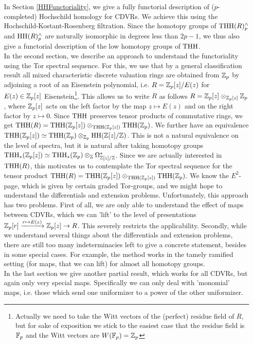 In Section \ref{HHFunctoriality}, we give a fully functorial description of ($p$-completed) Hochschild homology for CDVRs. We achieve this using the Hochschild-Kostant-Rosenberg filtration. Since the homotopy groups of $\operatorname{THH}(R)_p^{\wedge}$ and $\operatorname{HH}(R)_p^{\wedge}$ are naturally isomorphic in degrees less than $2p-1$, we thus also give a functorial description of the low homotopy groups of $\operatorname{THH}$.\\
In the second section, we describe an approach to understand the functoriality using the Tor spectral sequence. 
For this, we use that by a general classification result all mixed characteristic discrete valuation rings are obtained from $\mathbb{Z}_p$ by adjoining a root of an Eisenstein polynomial, i.e. $R=\mathbb{Z}_p[z]/E(z)$ for $E(z)\in \mathbb{Z}_p[z]$ Eisenstein\footnote{Actually we need to take the Witt vectors of the (perfect) residue field of $R$, but for sake of exposition we stick to the easiest case that the residue field is $\mathbb{F}_p$ and the Witt vectors are $W(\mathbb{F}_p)=\mathbb{Z}_p$}. This allows us to write $R$ as follows $R=\mathbb{Z}_p[z]\otimes_{\mathbb{Z}_p[z]}\mathbb{Z}_p$, where $\mathbb{Z}_p[z]$ acts on the left factor by the map $z\mapsto E(z)$ and on the right factor by $z\mapsto 0$. Since $\operatorname{THH}$ preserves tensor products of commutative rings, we get $\operatorname{THH}(R)=\operatorname{THH}(\mathbb{Z}_p[z])\otimes_{\operatorname{THH}(\mathbb{Z}_p[z])}\operatorname{THH}(\mathbb{Z}_p)$. We further have an equivalence $\operatorname{THH}(\mathbb{Z}_p[z])\simeq\operatorname{THH}(\mathbb{Z}_p)\otimes_{\mathbb{Z}_p}\operatorname{HH}(\mathbb{Z}[z]/\mathbb{Z})$. This is not a natural equivalence on the level of spectra, but it is natural after taking homotopy groups $\operatorname{THH}_*(\mathbb{Z}_p[z])\simeq\operatorname{THH}_*(\mathbb{Z}_p)\otimes_{\mathbb{Z}}\Omega^*_{\mathbb{Z}[z]/\mathbb{Z}}$. Since we are actually interested in $\operatorname{THH}(R)$, this motivates us to contemplate the Tor spectral sequence for the tensor product $\operatorname{THH}(R)=\operatorname{THH}(\mathbb{Z}_p[z])\otimes_{\operatorname{THH}(\mathbb{Z}_p[z])}\operatorname{THH}(\mathbb{Z}_p)$. We know the $E^2$-page, which is given by certain graded Tor-groups, and we might hope to understand the differentials and extension problems.
Unfortunately, this approach has two problems. First of all, we are only able to understand the effect of maps between CDVRs, which we can 'lift' to the level of presentations $\mathbb{Z}_p[r]\xrightarrow{r\mapsto E(z)} \mathbb{Z}_p[z]\rightarrow R$. This severely restricts the applicability. Secondly, while we understand several things about the differentials and extension problems, there are still too many indeterminacies left to give a concrete statement, besides in some special cases. For example, the method works in the tamely ramified setting (for maps, that we can lift) for almost all homotopy groups.\\
In the last section we give another partial result, which works for all CDVRs, but again only very special maps. Specifically we can only deal with 'monomial' maps, i.e. those which send one uniformizer to a power of the other uniformizer. 
